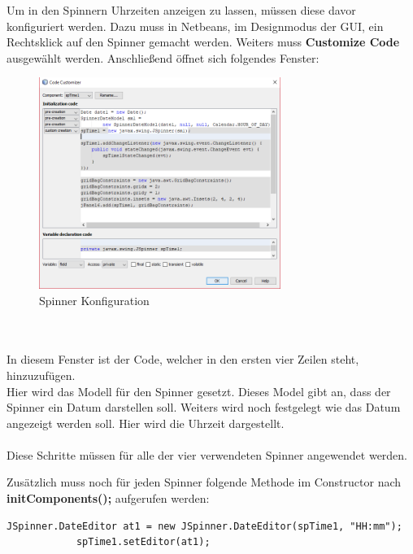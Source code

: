 \newpage

Um in den Spinnern Uhrzeiten anzeigen zu lassen, müssen diese davor konfiguriert werden. Dazu muss in Netbeans, im Designmodus der \ac{GUI}, ein Rechtsklick auf den Spinner gemacht werden. Weiters muss \textbf{Customize Code} ausgewählt werden. Anschließend öffnet sich folgendes Fenster: \\
\begin{figure}
\vspace{-20pt}
  \begin{center}
    \includegraphics[width=0.70\textwidth]{Bilder/Java_Programm/SpinnerConfiguration}
  \end{center}
  \caption{Spinner Konfiguration}
  \label{SpinnerKonfiguration}
  \vspace{-10pt}
\end{figure}
\\ \\ In diesem Fenster ist der Code, welcher in den ersten vier Zeilen steht, hinzuzufügen. 
\\ Hier wird das Modell für den Spinner gesetzt. Dieses Model gibt an, dass der Spinner ein Datum darstellen soll. Weiters wird noch festgelegt wie das Datum angezeigt werden soll. Hier wird die Uhrzeit dargestellt. 
\\ \\ Diese Schritte müssen für alle der vier verwendeten Spinner angewendet werden.

\vspace{30pt}

Zusätzlich muss noch für jeden Spinner folgende Methode im Constructor nach \textbf{initComponents();} aufgerufen werden:
\begin{lstlisting}[style=Javastyle, caption=Spinner Zeitzone]
	JSpinner.DateEditor at1 = new JSpinner.DateEditor(spTime1, "HH:mm");
        	spTime1.setEditor(at1);
\end{lstlisting}

